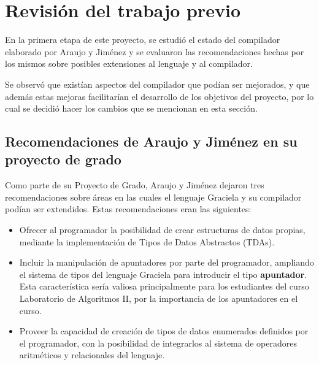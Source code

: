 \setcounter{section}{-1}
\section{Revisión del trabajo previo}

En la primera etapa de este proyecto, se estudió el estado del compilador
elaborado por Araujo y Jiménez y se evaluaron las recomendaciones hechas por los
mismos sobre posibles extensiones al lenguaje y al compilador.

Se observó que existían aspectos del compilador que podían ser mejorados, y que
además estas mejoras facilitarían el desarrollo de los objetivos del proyecto,
por lo cual se decidió hacer los cambios que se mencionan en esta sección.

\subsection{Recomendaciones de Araujo y Jiménez en su proyecto de grado}

Como parte de su Proyecto de Grado, Araujo y Jiménez dejaron tres
recomendaciones sobre áreas en las cuales el lenguaje Graciela y su compilador
podían ser extendidos. Estas recomendaciones eran las siguientes:

\begin{itemize}

  \item Ofrecer al programador la posibilidad de crear estructuras de datos
  propias, mediante la implementación de Tipos de Datos Abstractos (TDAs).

  \item Incluir la manipulación de apuntadores por parte del programador,
  ampliando el sistema de tipos del lenguaje Graciela para introducir el tipo
  \textbf{apuntador}. Esta característica sería valiosa principalmente para los
  estudiantes del curso Laboratorio de Algoritmos II, por la importancia de los
  apuntadores en el curso.

  \item Proveer la capacidad de creación de tipos de datos enumerados definidos
  por el programador, con la posibilidad de integrarlos al sistema de operadores
  aritméticos y relacionales del lenguaje.

\end{itemize}

